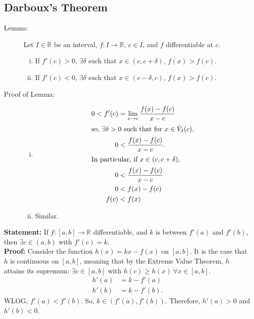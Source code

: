 \documentclass[10pt]{extarticle}
\newcommand{\R}{\mathbb{R}}
\begin{document}
  \subsection{Darboux's Theorem}%
    \begin{description}
      \item[Lemma:] Let $I\in\R$ be an interval, $f: I\rightarrow\R$, $c\in I$, and $f$ differentiable at $c$.
        \begin{enumerate}[(i)]
          \item If $f'(c) > 0$, $\exists \delta$ such that $x\in (c,c+\delta)$, $f(x) > f(c)$.
          \item If $f'(c) < 0$, $\exists \delta$ such that $x\in (c-\delta,c)$, $f(x) > f(c)$.
        \end{enumerate}
      \item[Proof of Lemma:]\hfill
        \begin{enumerate}[(i)]
          \item 
            \begin{align*}
              0 < f'(c) &= \lim_{x\rightarrow c}\frac{f(x)-f(c)}{x-c}\\
              \shortintertext{so, $\exists \delta > 0$ such that for $x\in \dot{V}_{\delta}(c)$,}
              0 &<\frac{f(x)-f(c)}{x-c}.\\
              \shortintertext{In particular, if $x\in (c,c+\delta)$,}
              0 &< \frac{f(x)-f(c)}{x-c}\\
              0 &< f(x)-f(c)\\
              f(c) &< f(x)
            \end{align*}
          \item Similar.
        \end{enumerate}
    \end{description}
    \textbf{Statement:} If $f: [a,b]\rightarrow \R$ differentiable, and $k$ is between $f'(a)$ and $f'(b)$, then $\exists c\in (a,b)$ with $f'(c) = k$.\\

    \textbf{Proof:} Consider the function $h(x) = kx-f(x)$ on $[a,b]$. It is the case that $h$ is continuous on $[a,b]$, meaning that by the Extreme Value Theorem, $h$ attains its supremum: $\exists c\in [a,b]$ with $h(c) \geq h(x)~\forall x\in [a,b]$.
    \begin{align*}
      h'(a) &= k-f'(a)\\
      h'(b) &= k-f'(b).
    \end{align*}
    WLOG, $f'(a) < f'(b)$. So, $k\in (f'(a),f'(b))$. Therefore, $h'(a) > 0$ and $h'(b) < 0$.\\
\end{document}
